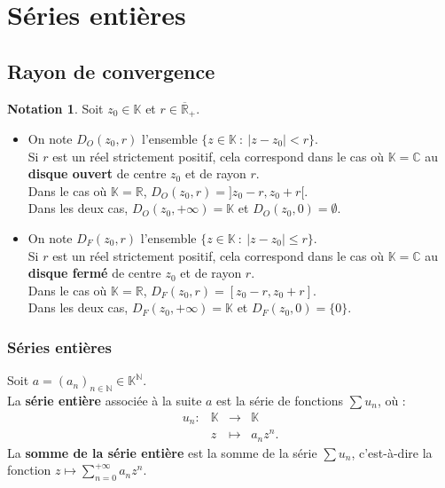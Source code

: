 \documentclass[french]{article}
\newcommand{\N}{\mathbb{N}}
\newcommand{\R}{\mathbb{R}}
\newcommand{\C}{\mathbb{C}}
\newcommand{\K}{\mathbb{K}}
\theoremstyle{plain}
\theoremstyle{definition}
\newtheorem*{notation}{Notation}
\theoremstyle{remark}
\begin{document}
\section{Séries entières}

\subsection{Rayon de convergence}

\begin{notation}
	Soit $z_0\in\K$ et $r\in\overline{\R}_+$.
\begin{itemize}
	\item On note $D_O(z_0,r)$ l'ensemble $\{z\in\K\ : \ \lvert z-z_0\rvert <r\}$. \\
	Si $r$ est un réel strictement positif, cela correspond dans le cas où $\K=\C$ au \textbf{disque ouvert} de centre $z_0$ et de rayon $r$.\\
	Dans le cas où $\K=\R$, $D_O(z_0,r)=]z_0-r,z_0+r[$.\\
	Dans les deux cas, $D_O(z_0,+\infty)=\K$ et $D_O(z_0,0)=\emptyset$.
	\item On note $D_F(z_0,r)$ l'ensemble $\{z\in\K\ : \ \lvert z-z_0\rvert \leqslant r\}$. \\
	Si $r$ est un réel strictement positif, cela correspond dans le cas où $\K=\C$ au \textbf{disque fermé} de centre $z_0$ et de rayon $r$.\\
	Dans le cas où $\K=\R$, $D_F(z_0,r)=[z_0-r,z_0+r]$.\\
	Dans les deux cas, $D_F(z_0,+\infty)=\K$ et $D_F(z_0,0)=\{0\}$.
\end{itemize}
\end{notation}

\subsubsection*{Séries entières}

\begin{dfn}
	Soit $a=(a_n)_{n\in\N}\in\K^\N$. \\
	La \textbf{série entière} associée à la suite $a$ est la série de fonctions $\displaystyle\sum u_n$, où : $$\begin{array}{lrcl}
		u_n:&\K&\longrightarrow&\K\\
		&z&\longmapsto&a_nz^n.
	\end{array}$$ La \textbf{somme de la série entière} est la somme de la série $\displaystyle\sum u_n$, c'est-à-dire la fonction $z\mapsto\displaystyle\sum_{n=0}^{+\infty}a_nz^n$.
\end{dfn}
\end{document}
